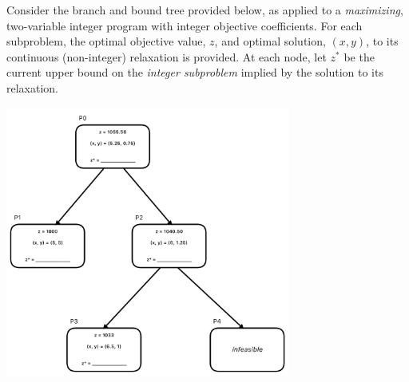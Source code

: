 \documentclass[12pt]{exam}
\begin{document}
\begin{questions}



\newpage
\question  Consider the branch and bound tree provided below, as applied to a \emph{maximizing}, two-variable integer program with integer objective coefficients.  For each subproblem, the optimal objective value, $z$, and optimal solution, $(x, y)$, to its continuous (non-integer) relaxation is provided. At each node, let $z^*$ be the current upper bound on the \emph{integer subproblem} implied by the solution to its relaxation.

\vspace{-0.6cm}
\begin{center}
\includegraphics[width=0.7\textwidth]{bb_tree}
\end{center}


\end{questions}
\end{document}
